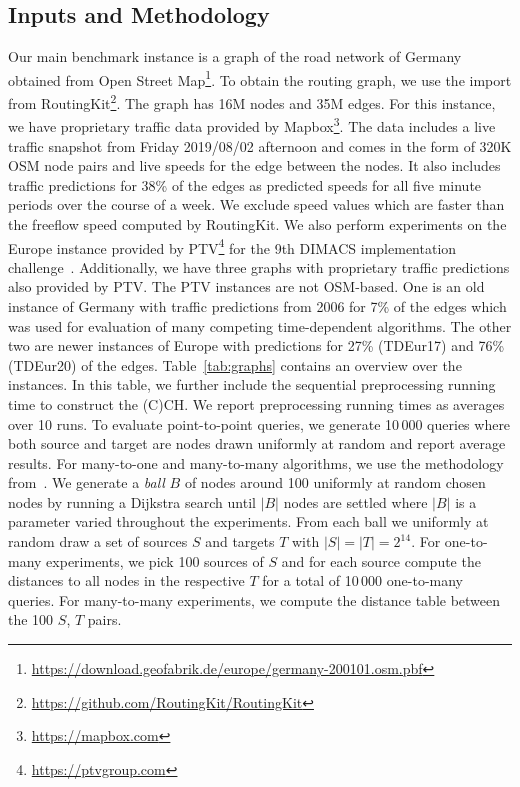 \documentclass[manuscript,review]{acmart}
\begin{document}
\subsection{Inputs and Methodology}
Our main benchmark instance is a graph of the road network of Germany obtained from Open Street Map\footnote{\url{https://download.geofabrik.de/europe/germany-200101.osm.pbf}}.
To obtain the routing graph, we use the import from RoutingKit\footnote{\url{https://github.com/RoutingKit/RoutingKit}}.
The graph has 16M nodes and 35M edges.
For this instance, we have proprietary traffic data provided by Mapbox\footnote{\url{https://mapbox.com}}.
The data includes a live traffic snapshot from Friday 2019/08/02 afternoon and comes in the form of 320K OSM node pairs and live speeds for the edge between the nodes.
It also includes traffic predictions for 38\% of the edges as predicted speeds for all five minute periods over the course of a week.
We exclude speed values which are faster than the freeflow speed computed by RoutingKit.
We also perform experiments on the Europe instance provided by PTV\footnote{\url{https://ptvgroup.com}} for the 9th DIMACS implementation challenge~\cite{DemetrescuGJ09}.
Additionally, we have three graphs with proprietary traffic predictions also provided by PTV.
The PTV instances are not OSM-based.
One is an old instance of Germany with traffic predictions from 2006 for 7\% of the edges which was used for evaluation of many competing time-dependent algorithms.
The other two are newer instances of Europe with predictions for 27\% (TDEur17) and 76\% (TDEur20) of the edges.
Table~\ref{tab:graphs} contains an overview over the instances.
In this table, we further include the sequential preprocessing running time to construct the (C)CH.
We report preprocessing running times as averages over 10 runs.
To evaluate point-to-point queries, we generate 10\,000 queries where both source and target are nodes drawn uniformly at random and report average results.
For many-to-one and many-to-many algorithms, we use the methodology from~\cite{delling_et_al:OASIcs:2011:3266}.
We generate a \emph{ball} $B$ of nodes around 100 uniformly at random chosen nodes by running a Dijkstra search until $|B|$ nodes are settled where $|B|$ is a parameter varied throughout the experiments.
From each ball we uniformly at random draw a set of sources $S$ and targets $T$ with $|S| = |T| = 2^{14}$.
For one-to-many experiments, we pick 100 sources of $S$ and for each source compute the distances to all nodes in the respective $T$ for a total of 10\,000 one-to-many queries.
For many-to-many experiments, we compute the distance table between the 100 $S$, $T$ pairs.
\end{document}

